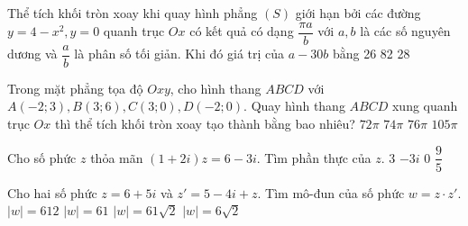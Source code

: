 \begin{ex}%
	Thể tích khối tròn xoay khi quay hình phẳng $(S)$ giới hạn bởi các đường $y=4-x^2, y=0$ quanh trục $Ox$ có kết quả có dạng $\dfrac{\pi a}{b}$ với $a,b$ là các số nguyên dương và $\dfrac{a}{b}$ là phân số tối giản. Khi đó giá trị của $a-30b$ bằng
	\choice 
	{}
	{26}
	{82}
	{28}
\end{ex}

\begin{ex}%
	Trong mặt phẳng tọa độ $Oxy$, cho hình thang $ABCD$ với $A(-2;3), B(3;6), C(3;0), D(-2;0)$. Quay hình thang $ABCD$ xung quanh trục $Ox$ thì thể tích khối tròn xoay tạo thành bằng  bao nhiêu?
	\choice 
	{$72 \pi$}
	{$74 \pi$}
	{$76 \pi$}
	{\True $105 \pi$}
\end{ex}

\begin{ex}%
	Cho số phức $z$ thỏa mãn $(1+2i)z = 6 -3i$. Tìm phần thực của $z$.
	\choice 
	{$3$}
	{$-3i$}
	{\True $0$}
	{$\dfrac{9}{5}$}
\end{ex}

\begin{ex}%
	Cho hai số phức $z = 6+ 5i$ và $z'=5-4i+z$. Tìm mô-đun của số phức $w=z\cdot z'$.
	\choice 
	{$|w|=612$}
	{$|w|=61$}
	{\True $|w|=61\sqrt{2}$}
	{$|w|=6\sqrt{2}$}
\end{ex}

